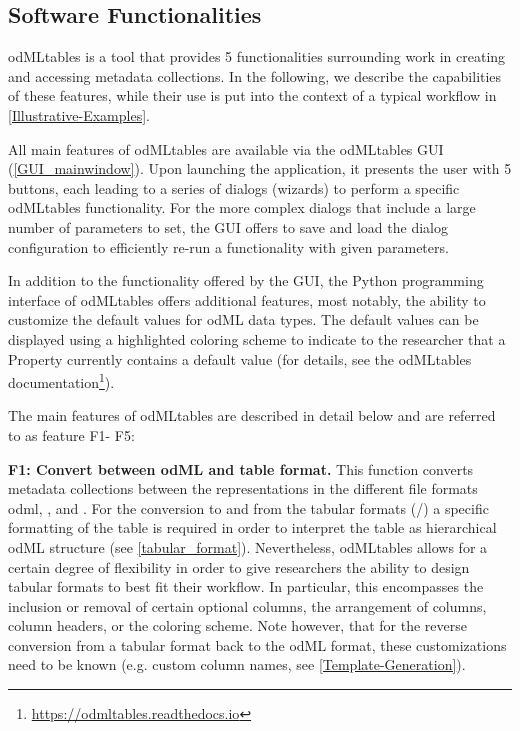 \subsection{Software Functionalities}
\label{sec:software_functionalities} 

odMLtables is a tool that provides 5 functionalities surrounding work in creating and accessing metadata collections. In the following, we describe the capabilities of these features, while their use is put into the context of a typical workflow in \cref{Illustrative-Examples}.

All main features of odMLtables are available via the odMLtables GUI (\cref{GUI_mainwindow}). Upon launching the application, it presents the user with 5 buttons, each leading to a series of dialogs (wizards) to perform a specific odMLtables functionality. For the more complex dialogs that include a large number of parameters to set, the GUI offers to save and load the dialog configuration to efficiently re-run a functionality with given parameters. 

In addition to the functionality offered by the GUI, the Python programming interface of odMLtables offers additional features, most notably, the ability to customize the default values for odML data types. The default values can be displayed using a highlighted coloring scheme to indicate to the researcher that a Property currently contains a default value (for details, see the odMLtables documentation\footnote{\url{https://odmltables.readthedocs.io}}).

\def\fconvert{F1}
\def\fgenerate{F2} 
\def\fcompare{F3}
\def\fmerge{F4}
\def\ffilter{F5} 

The main features of odMLtables are described in detail below and are referred to as feature \fconvert - \ffilter:


\textbf{\fconvert: Convert between odML and table format.}
This function converts metadata collections between the representations in the different file formats odml, , and . For the conversion to and from the tabular formats (/) a specific formatting of the table is required in order to interpret the table as hierarchical odML structure (see \cref{tabular_format}). Nevertheless, odMLtables allows for a certain degree of flexibility in order to give researchers the ability to design tabular formats to best fit their workflow. In particular, this encompasses the inclusion or removal of certain optional columns, the arrangement of columns, column headers, or the coloring scheme. Note however, that for the reverse conversion from a tabular format back to the odML format, these customizations need to be known (e.g. custom column names, see \cref{Template-Generation}).

